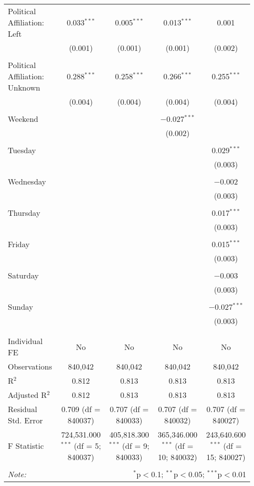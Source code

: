 \documentclass[
]{article}
\begin{document}
\begin{table}[!htbp]
{\begin{tabular}{@{\extracolsep{5pt}}lcccc}
 Political Affiliation: Left & 0.033$^{***}$ & 0.005$^{***}$ & 0.013$^{***}$ & 0.001 \\ 
  & (0.001) & (0.001) & (0.001) & (0.002) \\ 
  & & & & \\ 
 Political Affiliation: Unknown & 0.288$^{***}$ & 0.258$^{***}$ & 0.266$^{***}$ & 0.255$^{***}$ \\ 
  & (0.004) & (0.004) & (0.004) & (0.004) \\ 
  & & & & \\ 
 Weekend &  &  & $-$0.027$^{***}$ &  \\ 
  &  &  & (0.002) &  \\ 
  & & & & \\ 
 Tuesday &  &  &  & 0.029$^{***}$ \\ 
  &  &  &  & (0.003) \\ 
  & & & & \\ 
 Wednesday &  &  &  & $-$0.002 \\ 
  &  &  &  & (0.003) \\ 
  & & & & \\ 
 Thursday &  &  &  & 0.017$^{***}$ \\ 
  &  &  &  & (0.003) \\ 
  & & & & \\ 
 Friday &  &  &  & 0.015$^{***}$ \\ 
  &  &  &  & (0.003) \\ 
  & & & & \\ 
 Saturday &  &  &  & $-$0.003 \\ 
  &  &  &  & (0.003) \\ 
  & & & & \\ 
 Sunday &  &  &  & $-$0.027$^{***}$ \\ 
  &  &  &  & (0.003) \\ 
  & & & & \\ 
\hline \\[-1.8ex] 
Individual FE & No & No & No & No \\ 
Observations & 840,042 & 840,042 & 840,042 & 840,042 \\ 
R$^{2}$ & 0.812 & 0.813 & 0.813 & 0.813 \\ 
Adjusted R$^{2}$ & 0.812 & 0.813 & 0.813 & 0.813 \\ 
Residual Std. Error & 0.709 (df = 840037) & 0.707 (df = 840033) & 0.707 (df = 840032) & 0.707 (df = 840027) \\ 
F Statistic & 724,531.000$^{***}$ (df = 5; 840037) & 405,818.300$^{***}$ (df = 9; 840033) & 365,346.000$^{***}$ (df = 10; 840032) & 243,640.600$^{***}$ (df = 15; 840027) \\ 
\hline 
\hline \\[-1.8ex] 
\textit{Note:}  & \multicolumn{4}{r}{$^{*}$p$<$0.1; $^{**}$p$<$0.05; $^{***}$p$<$0.01} \\ 
\end{tabular}
} 
\end{table} 
\newpage
\end{document}

